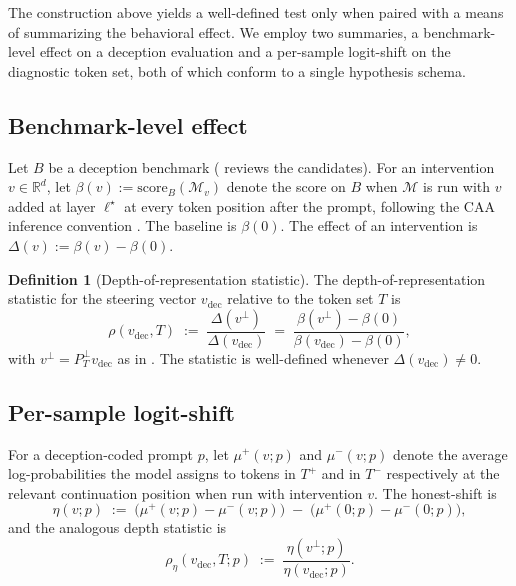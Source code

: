 \documentclass[11pt,letterpaper]{article}
\theoremstyle{plain}
\theoremstyle{definition}
\newtheorem{definition}[theorem]{Definition}
\newcommand{\R}{\mathbb{R}}
\newcommand{\1}{\mathbf{1}}
\newcommand{\vdec}{v_{\text{dec}}}
\newcommand{\vperp}{v^{\perp}}
\newcommand{\PTperp}{P_{T}^{\perp}}
\begin{document}
The construction above yields a well-defined test only when paired with a means of summarizing the behavioral effect. We employ two summaries, a benchmark-level effect on a deception evaluation and a per-sample logit-shift on the diagnostic token set, both of which conform to a single hypothesis schema.

\subsection{Benchmark-level effect}

Let $B$ be a deception benchmark ( reviews the candidates). For an intervention $v \in \R^d$, let $\beta(v) := \text{score}_B(\mathcal{M}_v)$ denote the score on $B$ when $\mathcal{M}$ is run with $v$ added at layer $\ell^\star$ at every token position after the prompt, following the CAA inference convention \cite{rimsky2024caa}. The baseline is $\beta(0)$. The effect of an intervention is $\Delta(v) := \beta(v) - \beta(0)$.

\begin{definition}[Depth-of-representation statistic]\label{def:rho}
The depth-of-representation statistic for the steering vector $\vdec$ relative to the token set $T$ is
\begin{equation}
\rho(\vdec, T) \;:=\; \frac{\Delta(\vperp)}{\Delta(\vdec)} \;=\; \frac{\beta(\vperp) - \beta(0)}{\beta(\vdec) - \beta(0)},
\label{eq:rho}
\end{equation}
with $\vperp = \PTperp \vdec$ as in . The statistic is well-defined whenever $\Delta(\vdec) \neq 0$.
\end{definition}

\subsection{Per-sample logit-shift}

For a deception-coded prompt $p$, let $\mu^+(v; p)$ and $\mu^-(v; p)$ denote the average log-probabilities the model assigns to tokens in $T^+$ and in $T^-$ respectively at the relevant continuation position when run with intervention $v$. The honest-shift is
\begin{equation}
\eta(v; p) \;:=\; \big( \mu^+(v; p) - \mu^-(v; p) \big) \;-\; \big( \mu^+(0; p) - \mu^-(0; p) \big),
\label{eq:eta}
\end{equation}
and the analogous depth statistic is
\begin{equation}
\rho_{\eta}(\vdec, T; p) \;:=\; \frac{\eta(\vperp; p)}{\eta(\vdec; p)}.
\label{eq:rhoeta}
\end{equation}
\end{document}
